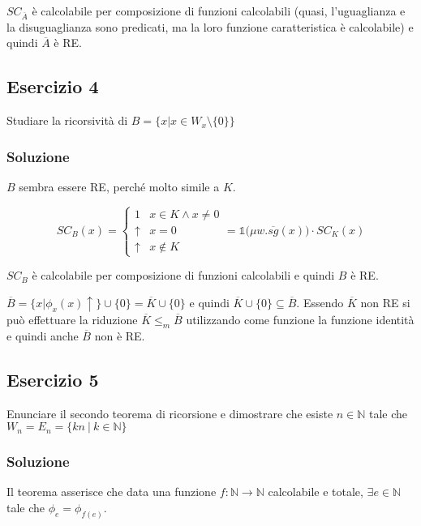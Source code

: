 $SC_{\overline{A}}$ è calcolabile per composizione di funzioni calcolabili (quasi, l'uguaglianza e la disuguaglianza sono predicati, ma la loro funzione caratteristica è calcolabile) e quindi $\overline{A}$ è RE.

\subsection{Esercizio 4}

Studiare la ricorsività di $B = \{  x | x \in W_x \setminus \{0\} \}$

\subsubsection{Soluzione}

$B$ sembra essere RE, perché molto simile a $K$.

$$
SC_B(x) = \begin{cases}
1 & x \in K \wedge x \neq 0 \\
\uparrow & x = 0 \\
\uparrow & x \notin K
\end{cases} = \mathbb{1}\big(\mu w. \overline{sg}(x) \big) \cdot SC_K(x)
$$

$SC_B$ è calcolabile per composizione di funzioni calcolabili e quindi $B$ è RE.


$\overline{B} = \{ x | \phi_x(x) \uparrow  \} \cup \{ 0 \} = \overline{K} \cup \{0\}$ e quindi $\overline{K} \cup \{0\} \subseteq \overline{B}$. 
Essendo $\overline{K}$ non RE si può effettuare la riduzione $\overline{K} \leq_m \overline{B}$ utilizzando come funzione la funzione identità e quindi anche $\overline{B}$ non è RE.


\subsection{Esercizio 5}

Enunciare il secondo teorema di ricorsione e dimostrare che esiste $n \in \mathbb{N}$ tale che $W_n  = E_n = \{ k n \: | \: k \in \mathbb{N} \}$

\subsubsection{Soluzione}

Il teorema asserisce che data una funzione $f : \mathbb{N} \rightarrow \mathbb{N}$ calcolabile e totale, $\exists e \in \mathbb{N}$ tale che $\phi_e = \phi_{f(e)}$.

